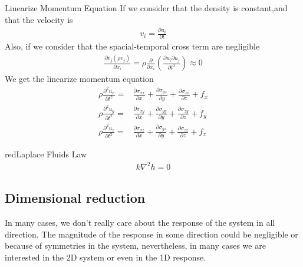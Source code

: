 \documentclass[a4paper, 11pt,article,oneside]{memoir}%
\begin{document}
\begin{eqbox2}{}{Linearize Momentum Equation}
If we consider that the density is constant,and that the velocity is 
\begin{gather*}
v_i=\frac{\partial u_i}{\partial t}
\end{gather*}
Also, if we consider that the spacial-temporal cross term are negligible
\begin{gather*}
\frac{\partial v_j( \rho v_j)}{\partial x_i}=\rho\frac{\partial}{\partial x_i}\left(\frac{\partial  u_i \partial  u_j}{\partial t^2}\right)\approx 0
\end{gather*}
We get the linearize momentum equation
\begin{align*}
\rho \frac{\partial^2u_x}{\partial t^2}=
&\frac{\partial\sigma_{xx}}{\partial x}+\frac{\partial\sigma_{yx}}{\partial y}+\frac{\partial\sigma_{zx}}{\partial z}+f_x\\
\rho \frac{\partial^2u_y}{\partial t^2}=&\frac{\partial\sigma_{xy}}{\partial x}+\frac{\partial\sigma_{yy}}{\partial y}+\frac{\partial\sigma_{zy}}{\partial z}+f_y\\
\rho \frac{\partial^2u_z}{\partial t^2}=&\frac{\partial\sigma_{xz}}{\partial x}+\frac{\partial\sigma_{yz}}{\partial y}+\frac{\partial\sigma_{zz}}{\partial z}+f_z
\end{align*}
\end{eqbox2}


\begin{eqbox2}{red}{Laplace Fluids Law}\label{LaplaceFlow}
\begin{align*}
k\nabla^2h=0
\end{align*}
\end{eqbox2}
{\color{magenta}\subsection{Dimensional reduction}}
In many cases, we don't really care about the response of the system in all direction. The magnitude of the response in some direction could be negligible or because of symmetries in the system, nevertheless, in many cases we are interested in the 2D system or even in the 1D response. 
\end{document}
